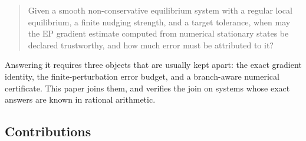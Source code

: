 \documentclass[11pt]{article}
\theoremstyle{definition}
\theoremstyle{remark}
\begin{document}
\begin{quote}
Given a smooth non-conservative equilibrium system with a regular local equilibrium, a
finite nudging strength, and a target tolerance, when may the EP gradient estimate computed from
numerical stationary states be declared trustworthy, and how much error must be attributed to it?
\end{quote}

Answering it requires three objects that are usually kept apart: the exact gradient identity, the
finite-perturbation error budget, and a branch-aware numerical certificate. This paper joins
them, and verifies the join on systems whose exact answers are known in rational arithmetic.

\subsection{Contributions}
\end{document}
